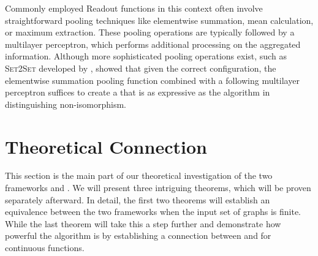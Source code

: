 \begin{table}[H]
    \centering
    \caption{Overview of the construction of the \textit{message-passing} layers and their respective learnable parameters by popular \gnn model.}
    \label{tab:models}
\end{table}

Commonly employed \textsf{Readout} functions in this context often involve straightforward pooling techniques like elementwise summation, mean calculation, or maximum extraction. These pooling operations are typically followed by a multilayer perceptron, which performs additional processing on the aggregated information. Although more sophisticated pooling operations exist, such as \textsc{Set2Set} developed by \cite{Vinyals2015}, \cite{Xu2018} showed that given the correct configuration, the elementwise summation pooling function combined with a following multilayer perceptron suffices to create a \gnn that is as expressive as the \wl algorithm in distinguishing non-isomorphism.

\section{Theoretical Connection}\label{sec:theo_connections}
This section is the main part of our theoretical investigation of the two frameworks \wlnn and \gnn. We will present three intriguing theorems, which will be proven separately afterward. In detail, the first two theorems will establish an equivalence between the two frameworks when the input set of graphs is finite. While the last theorem will take this a step further and demonstrate how powerful the \wl algorithm is by establishing a connection between \wlnn and \gnn for continuous functions.

